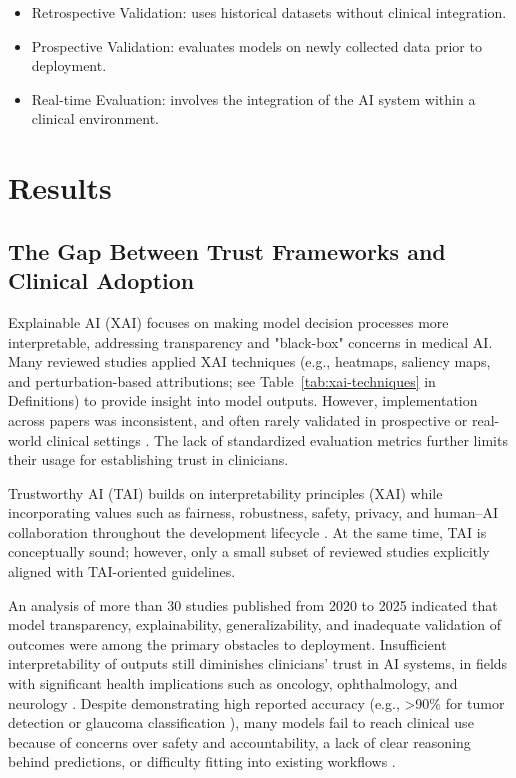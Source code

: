 \documentclass{article}
\begin{document}
\begin{itemize}
\item Retrospective Validation: uses historical datasets without clinical integration.
\item Prospective Validation: evaluates models on newly collected data prior to deployment.
\item Real-time Evaluation: involves the integration of the AI system within a clinical environment.
\end{itemize}

\section{Results}
\subsection{The Gap Between Trust Frameworks and Clinical Adoption}
Explainable AI (XAI) focuses on making model decision processes more interpretable, addressing transparency and "black-box" concerns in medical AI. Many reviewed studies applied XAI techniques (e.g., heatmaps, saliency maps, and perturbation-based attributions; see Table~\ref{tab:xai-techniques} in Definitions) to provide insight into model outputs. However, implementation across papers was inconsistent, and often rarely validated in prospective or real-world clinical settings \cite{raghavan_2024_explainable, hou_2024_selfexplainable}. The lack of standardized evaluation metrics further limits their usage for establishing trust in clinicians.

Trustworthy AI (TAI) builds on interpretability principles (XAI) while incorporating values such as fairness, robustness, safety, privacy, and human–AI collaboration throughout the development lifecycle \cite{lekadir_2025_futureai, wu_2023_trustworthy}. At the same time, TAI is conceptually sound; however, only a small subset of reviewed studies explicitly aligned with TAI-oriented guidelines.

An analysis of more than 30 studies published from 2020 to 2025 indicated that model transparency, explainability, generalizability, and inadequate validation of outcomes were among the primary obstacles to deployment. Insufficient interpretability of outputs still diminishes clinicians' trust in AI systems, in fields with significant health implications such as oncology, ophthalmology, and neurology \cite{hua_2024_understanding, paulo_2024_advancements, mcnamara_2024_the}. Despite demonstrating high reported accuracy (e.g., >90\% for tumor detection or glaucoma classification \cite{tang_2019_the, paulo_2024_advancements, li_2024_role}), many models fail to reach clinical use because of concerns over safety and accountability, a lack of clear reasoning behind predictions, or difficulty fitting into existing workflows \cite{zakaria_2024_advancements, rao_2025_multimodal}.
\end{document}
